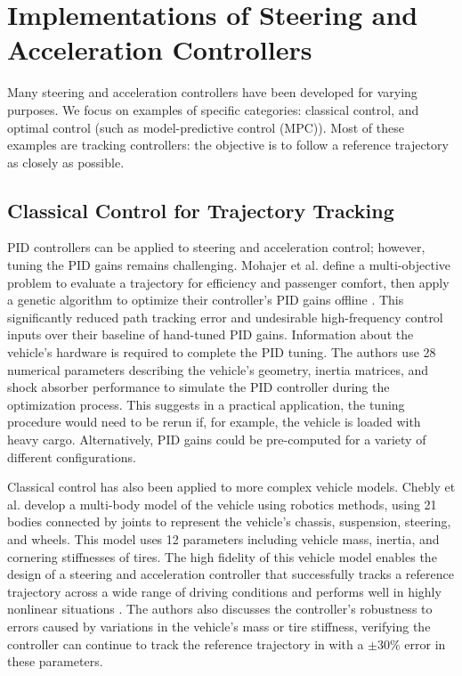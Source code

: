 \documentclass[conference]{IEEEtran}
\begin{document}
\section{Implementations of Steering and Acceleration Controllers}
Many steering and acceleration controllers have been developed for varying purposes. We focus on examples of specific categories: classical control, and optimal control (such as model-predictive control (MPC)). Most of these examples are tracking controllers: the objective is to follow a reference trajectory as closely as possible.

\subsection{Classical Control for Trajectory Tracking}
PID controllers can be applied to steering and acceleration control; however, tuning the PID gains remains challenging. Mohajer et al. define a multi-objective problem to evaluate a trajectory for efficiency and passenger comfort, then apply a genetic algorithm to optimize their controller's PID gains offline \cite{pid}. This significantly reduced path tracking error and undesirable high-frequency control inputs over their baseline of hand-tuned PID gains. Information about the vehicle's hardware is required to complete the PID tuning. The authors use 28 numerical parameters describing the vehicle's geometry, inertia matrices, and shock absorber performance to simulate the PID controller during the optimization process. This suggests in a practical application, the tuning procedure would need to be rerun if, for example, the vehicle is loaded with heavy cargo. Alternatively, PID gains could be pre-computed for a variety of different configurations.


Classical control has also been applied to more complex vehicle models. Chebly et al. develop a multi-body model of the vehicle using robotics methods, using 21 bodies connected by joints to  represent the vehicle's chassis, suspension, steering, and wheels.  \cite{CHEBLY201712526} This model uses 12 parameters including vehicle mass, inertia, and cornering stiffnesses of tires. The high fidelity of this vehicle model enables the design of a steering and acceleration controller that successfully tracks a reference trajectory across a wide range of driving conditions and performs well in highly nonlinear situations \cite{CHEBLY201712526}. The authors also discusses the controller's robustness to errors caused by variations in the vehicle's mass or tire stiffness, verifying the controller can continue to track the reference trajectory in with a $\pm30\%$ error in these parameters.
\end{document}
